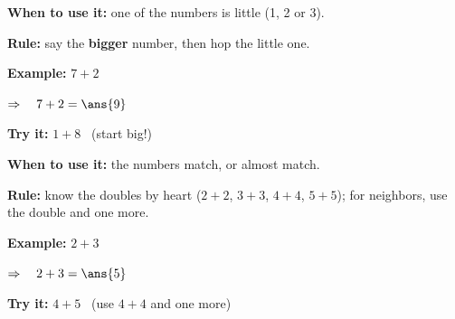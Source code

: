 \documentclass[12pt]{article}
\begin{document}


\begin{formulabox}
\textbf{When to use it:} one of the numbers is little (1, 2 or 3).\par
\textbf{Rule:} say the \textbf{bigger} number, then hop the little one.
\end{formulabox}

\begin{examplebox}
\textbf{Example:} \quad $7 + 2$

$\Rightarrow\quad 7 + 2 = \ans{9}$
\end{examplebox}

\begin{tryitbox}
\textbf{Try it:} \quad $1 + 8$ \ (start big!)\\[2pt]
\end{tryitbox}


\begin{formulabox}
\textbf{When to use it:} the numbers match, or almost match.\par
\textbf{Rule:} know the doubles by heart ($2+2$, $3+3$, $4+4$, $5+5$); for
neighbors, use the double and one more.
\end{formulabox}

\begin{examplebox}
\textbf{Example:} \quad $2 + 3$

$\Rightarrow\quad 2 + 3 = \ans{5}$
\end{examplebox}

\begin{tryitbox}
\textbf{Try it:} \quad $4 + 5$ \ (use $4+4$ and one more)\\[2pt]
\end{tryitbox}

\end{document}
